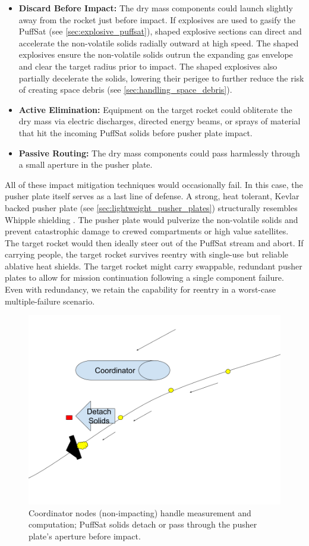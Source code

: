 \documentclass{article}
\begin{document}
\begin{itemize}
    \item \textbf{Discard Before Impact:}  The dry mass components could launch slightly away from the rocket just before impact. If explosives are used to gasify the PuffSat (see \autoref{sec:explosive_puffsat}), shaped explosive sections can direct and accelerate the non-volatile solids radially outward at high speed.   The shaped explosives ensure the non-volatile solids  outrun the expanding gas envelope and clear the target radius prior to impact.  The shaped explosives also partially decelerate the solids, lowering their perigee to further reduce the risk of creating space debris (see \autoref{sec:handling_space_debris}). \label{item:discard_before_impact}
    \item \textbf{Active Elimination:} Equipment on the target rocket could obliterate the dry mass via electric discharges, directed energy beams, or sprays of material that hit the incoming PuffSat solids before pusher plate impact.
    \item \textbf{Passive Routing:} The dry mass components could pass harmlessly through a small aperture in the pusher plate.
\end{itemize} 

All of these impact mitigation techniques would occasionally fail.  In this case, the pusher plate itself serves as a last line of defense.   A strong, heat tolerant, Kevlar backed pusher plate (see \autoref{sec:lightweight_pusher_plates}) structurally resembles  Whipple shielding \cite{whipple_shield}.  The pusher plate would pulverize the non-volatile solids and prevent catastrophic damage to crewed compartments or high value satellites.  The target rocket would then ideally steer out of the PuffSat stream and abort.  If carrying people, the target rocket survives reentry with single-use but reliable ablative heat shields.  The target rocket might carry swappable, redundant pusher plates to allow for mission continuation following a single component failure.  Even with redundancy, we retain the capability for reentry in a  worst-case multiple-failure scenario.

\begin{figure}[htpb]
    \centering
    \includegraphics[width=0.5\linewidth]{images/Coordinator Nodes.png}
    \caption{Coordinator nodes (non-impacting) handle measurement and computation; PuffSat solids detach or pass through the pusher plate's aperture before impact.}
    \label{fig:coordinator-nodes}
\end{figure} 
\end{document}
